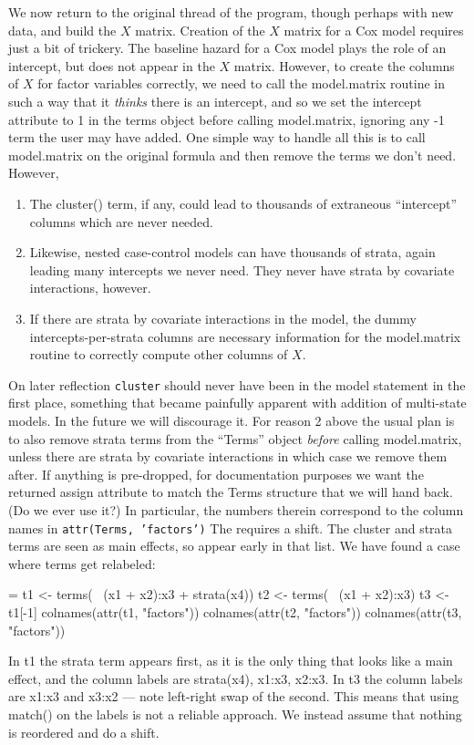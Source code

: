 \documentclass{article}
\newcommand{\code}[1]{\texttt{#1}}
\begin{document}
We now return to the original thread of the program, though perhaps
with new data, and build the $X$ matrix.
Creation of the $X$ matrix for a Cox model requires just a bit of
trickery.  
The baseline hazard for a Cox model plays the role of an intercept,
but does not appear in the $X$ matrix.  
However, to create the columns of $X$ for factor variables correctly,
we need to call the model.matrix routine in such a way that it \emph{thinks}
there is an intercept, and so we set the intercept attribute to 1 in
the terms object before calling model.matrix, ignoring any -1 term the
user may have added. 
One simple way to handle all this is to call model.matrix on the original 
formula and then remove the terms we don't need.  
However, 
\begin{enumerate}
  \item The cluster() term, if any, could lead to thousands of extraneous
    ``intercept'' columns which are never needed.
  \item Likewise, nested  case-control models can have thousands of strata,
    again leading many intercepts we never need.  They never have strata by
    covariate interactions, however.
  \item If there are strata by covariate interactions in the model, 
    the dummy intercepts-per-strata columns are necessary information for the
    model.matrix routine to correctly compute other columns of $X$.
\end{enumerate}

On later reflection \code{cluster} should never have been in the model
statement in the first place, something that became painfully apparent
with addition of multi-state models.
In the future we will discourage it.
For reason 2 above the usual plan is to also remove strata 
terms from the ``Terms'' object \emph{before} calling model.matrix,
unless there are strata by covariate interactions in which case we remove
them after.
If anything is pre-dropped, for documentation purposes we want the
returned assign attribute to match the Terms structure that we will
hand back.  (Do we ever use it?)
In particular, the numbers therein correspond to the column names in
\code{attr(Terms, 'factors')}
The requires a shift.  The cluster and strata terms are seen as main
effects, so appear early in that list.
We have found a case where terms get relabeled:
\begin{nwchunk}
=
  t1 <- terms( ~(x1 + x2):x3 + strata(x4))
  t2 <- terms( ~(x1 + x2):x3)
  t3 <- t1[-1]
  colnames(attr(t1, "factors"))
  colnames(attr(t2, "factors"))
  colnames(attr(t3, "factors"))
\end{nwchunk}
In t1 the strata term appears first, as it is the only thing that looks like
a main effect, and the column labels are strata(x4), x1:x3, x2:x3.
In t3 the column labels are x1:x3 and x3:x2 --- note left-right swap of 
the second.  This means that using match() on the labels is not a reliable
approach.
We instead assume that nothing is reordered and do a shift.
\end{document}
